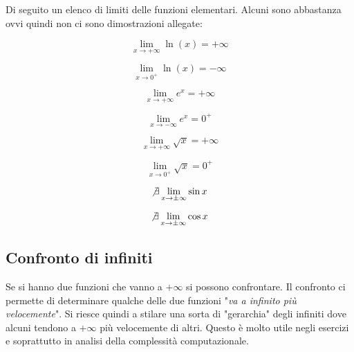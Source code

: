 Di seguito un elenco di limiti delle funzioni elementari. Alcuni sono abbastanza ovvi quindi non ci sono dimostrazioni allegate:

\begin{multicols}{2}
    \begin{equation*}
        \lim _{x \to +\infty} \ln(x) = +\infty
    \end{equation*}
    
    \begin{equation*}
        \lim _{x \to 0^+} \ln(x) = -\infty
    \end{equation*}
    
    \begin{equation*}
        \lim _{x \to +\infty} e^x = +\infty
    \end{equation*}

    \begin{equation*}
        \lim _{x \to -\infty} e^x = 0^+
    \end{equation*}

    \begin{equation*}
        \lim _{x \to +\infty} \sqrt{x} = +\infty
    \end{equation*}

    \begin{equation*}
        \lim _{x \to 0^+} \sqrt{x} = 0^+
    \end{equation*}

    \begin{equation*}
        \not \exists \lim _{x \to \pm \infty} \sin{x}
    \end{equation*}
    
    \begin{equation*}
        \not \exists \lim _{x \to \pm \infty} \cos{x}
    \end{equation*}
\end{multicols}


\subsection{Confronto di infiniti} \label{sec_gerarchiaInfiniti}

Se si hanno due funzioni che vanno a $+\infty$ si possono confrontare. Il confronto ci permette di determinare qualche delle due funzioni "\textit{va a infinito più velocemente}". Si riesce quindi a stilare una sorta di "gerarchia" degli infiniti dove alcuni tendono a $+\infty$ più velocemente di altri. Questo è molto utile negli esercizi e soprattutto in analisi della complessità computazionale.\\

